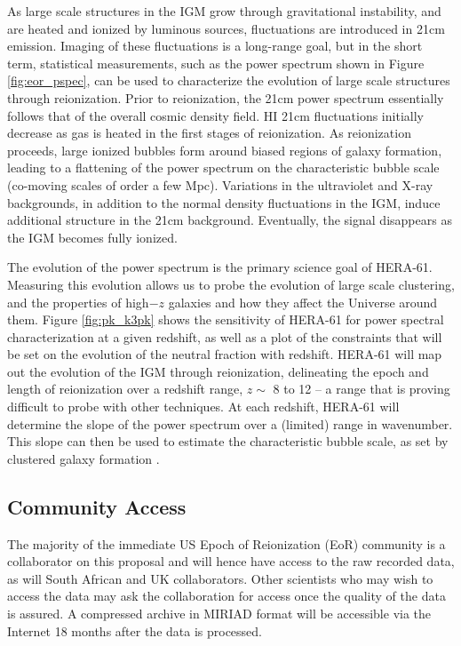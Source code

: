 \documentclass[preprint]{aastex}
\begin{document}
As large scale structures in the IGM grow through gravitational
instability, and are heated and ionized by luminous sources,
fluctuations are introduced in 21cm emission. %
Imaging of these fluctuations is a long-range
goal, but in the short term, statistical measurements, such as the
power spectrum shown in Figure \ref{fig:eor_pspec}, 
can be used to
characterize the evolution of large scale structures through
reionization.
Prior to reionization, the 21cm power spectrum essentially
follows that of the overall cosmic density field.  HI 21cm
fluctuations initially decrease as gas is heated in the first stages
of reionization.  As reionization proceeds, large ionized bubbles form
around biased regions of galaxy formation, leading to a flattening of
the power spectrum on the characteristic bubble scale (co-moving scales
of order a few Mpc). Variations in the ultraviolet and X-ray
backgrounds, in addition to the normal density fluctuations in the
IGM, induce additional structure in the 21cm background. Eventually,
the signal disappears as the IGM becomes fully ionized.

 
The evolution of the power spectrum is the primary science goal of
HERA-61. Measuring this evolution allows us to probe the evolution of
large scale clustering, and the properties of high$-z$ galaxies and
how they affect the Universe around them.  Figure \ref{fig:pk_k3pk} shows the
sensitivity of HERA-61 for power spectral characterization at a given
redshift, as well as a plot of the constraints that will be set on the
evolution of the neutral fraction with redshift. HERA-61 will map out
the evolution of the IGM through reionization, delineating the epoch
and length of reionization over a redshift range, $z \sim $ 8 to 12 -- a 
range that is proving difficult to probe with other techniques. At each
redshift, HERA-61 will determine the slope of the power spectrum over
a (limited) range in wavenumber. This slope can then be used to
estimate the characteristic bubble scale, as set by clustered
galaxy formation \citep{pober_et_al2013c}.

\vspace{-0.25in}
\subsection{Community Access}
\vspace{-6pt}
The majority of the immediate US Epoch of Reionization (EoR) community is a collaborator on this 
proposal and will hence have access to the raw recorded data, as will South
African and UK collaborators.  Other scientists
who may wish to access the data may ask the collaboration for access once
the quality of the data is assured.  A compressed archive in MIRIAD format will be accessible
via the Internet 18 months after the data is processed.
\end{document}
